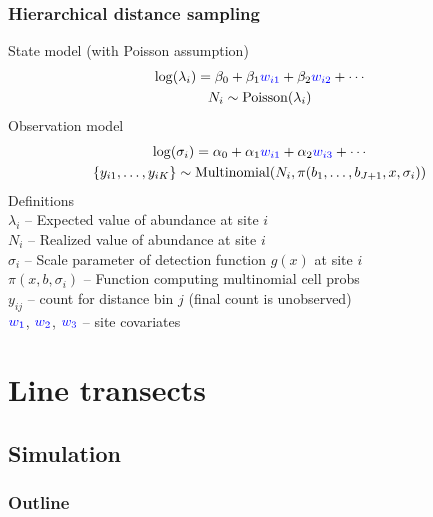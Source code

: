 \documentclass[color=usenames,dvipsnames]{beamer}\usepackage[]{graphicx}\usepackage[]{color}
\begin{document}
\begin{frame}
  \frametitle{Hierarchical distance sampling}
  \small
  State model (with Poisson assumption)
  \begin{gather*}
    \mathrm{log}(\lambda_i) = \beta_0 + \beta_1 {\color{blue} w_{i1}} +
    \beta_2 {\color{blue} w_{i2}} + \cdots \\
    N_i \sim \mathrm{Poisson}(\lambda_i)
  \end{gather*}
  \pause
  Observation model
  \begin{gather*}
    \mathrm{log}(\sigma_{i}) = \alpha_0 + \alpha_1 {\color{blue} w_{i1}}
    + \alpha_2 {\color{blue} w_{i3}} + \cdots \\
    \{y_{i1}, \dots, y_{iK}\}  \sim \mathrm{Multinomial}(N_i,
    \pi(b_1, \dots, b_{J+1}, x, \sigma_i))
  \end{gather*}
  \pause
  \small
  Definitions \\
  $\lambda_i$ -- Expected value of abundance at site $i$ \\
  $N_i$ -- Realized value of abundance at site $i$ \\
  $\sigma_{i}$ -- Scale parameter of detection function $g(x)$ at site $i$ \\
  $\pi(x,b,\sigma_i)$ -- Function computing multinomial cell probs \\
  $y_{ij}$ -- count for distance bin $j$ (final count is unobserved) \\
  $\color{blue} w_1$, $\color{blue} w_2$, $\color{blue} w_3$ -- site covariates %
\end{frame}






\section{Line transects}



\subsection{Simulation}

\begin{frame}
  \frametitle{Outline}
  \Large
  \tableofcontents[currentsection]
\end{frame}
\end{document}

